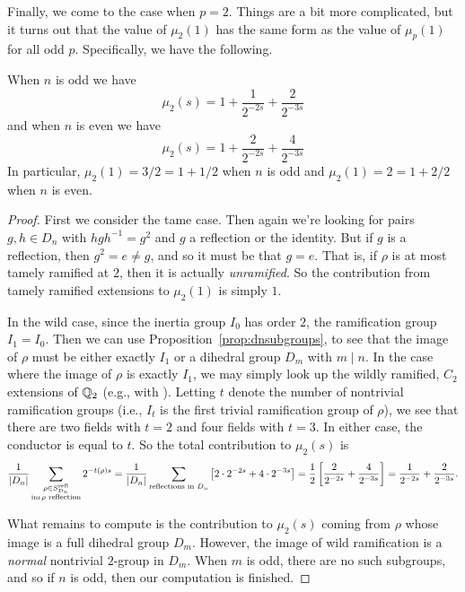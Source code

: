 Finally, we come to the case when $p = 2$. Things are a bit more complicated,
but it turns out that the value of $\mu_2(1)$ has the same form as the value of
$\mu_p(1)$ for all odd $p$. Specifically, we have the following.

\begin{prop}\label{prop:finiteprimesevenp}
  When $n$ is odd we have
  \[ \mu_2(s) = 1 + \frac{1}{2^{-2s}} + \frac{2}{2^{-3s}} \]
  and when $n$ is even we have
  \[ \mu_2(s) = 1 + \frac{2}{2^{-2s}} + \frac{4}{2^{-3s}} \]
  In particular, $\mu_2(1) = 3/2 = 1 + 1/2$ when $n$ is odd and $\mu_2(1) = 2 = 1 + 2/2$ when $n$ is even.
\end{prop}
\begin{proof}

First we consider the tame case.  Then again we're looking for pairs $g, h \in
D_n$ with $hgh^{-1} = g^2$ and $g$ a reflection or the identity. But if $g$ is
a reflection, then $g^2 = e \ne g$, and so it must be that $g = e$. That is, if
$\rho$ is at most tamely ramified at $2$, then it is actually {\em unramified}.
So the contribution from tamely ramified extensions to $\mu_2(1)$ is simply
$1$.

In the wild case, since the inertia group $I_0$ has order $2$, the ramification
group $I_1 = I_0$. Then we can use Proposition~\ref{prop:dnsubgroups}, to see
that the image of $\rho$ must be either exactly $I_1$ or a dihedral group $D_m$
with $m \mid n$. In the case where the image of $\rho$ is exactly $I_1$, we may
simply look up the wildly ramified, $C_2$ extensions of $\mathbb{Q}_2$ (e.g., with
\cite{LMFDB}). Letting $t$ denote the number of nontrivial ramification groups
(i.e., $I_t$ is the first trivial ramification group of $\rho$), we see that
there are two fields with $t = 2$ and four fields with $t = 3$. In either case,
the conductor is equal to $t$.  So the total contribution to $\mu_2(s)$ is
\[ \frac{1}{|D_n|} \sum_{\substack{\rho \in S_{D_n}^{\mathrm{refl}} \\ \operatorname{im} \rho\text{ reflection}}} 2^{-t(\rho) s}
= \frac{1}{|D_n|} \sum_{\text{reflections in $D_n$}} \left[ 2 \cdot 2^{-2s} + 4 \cdot 2^{-3s}
\right]
= \frac{1}{2} \left[ \frac{2}{2^{-2s}} + \frac{4}{2^{-3s}} \right]
= \frac{1}{2^{-2s}} + \frac{2}{2^{-3s}}.
\]

What remains to compute is the contribution to $\mu_2(s)$ coming from
$\rho$ whose image is a full dihedral group $D_m$. However, the image of wild
ramification is a {\em normal} nontrivial $2$-group in $D_m$. When $m$ is odd,
there are no such subgroups, and so if $n$ is odd, then our computation is
finished.


\end{proof}
